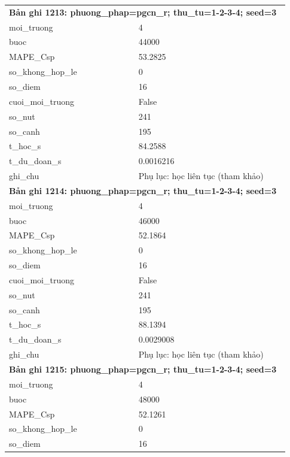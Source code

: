 \begin{longtable}{p{0.43\linewidth}p{0.50\linewidth}}
\midrule
\multicolumn{2}{p{0.95\linewidth}}{\textbf{Bản ghi 1213: phuong\_phap=pgcn\_r; thu\_tu=1-2-3-4; seed=3}} \\
moi\_\allowbreak truong & 4 \\
buoc & 44000 \\
MAPE\_\allowbreak Csp & 53.2825 \\
so\_\allowbreak khong\_\allowbreak hop\_\allowbreak le & 0 \\
so\_\allowbreak diem & 16 \\
cuoi\_\allowbreak moi\_\allowbreak truong & False \\
so\_\allowbreak nut & 241 \\
so\_\allowbreak canh & 195 \\
t\_\allowbreak hoc\_\allowbreak s & 84.2588 \\
t\_\allowbreak du\_\allowbreak doan\_\allowbreak s & 0.0016216 \\
ghi\_\allowbreak chu & Phụ lục: học liên tục (tham khảo) \\
\midrule
\multicolumn{2}{p{0.95\linewidth}}{\textbf{Bản ghi 1214: phuong\_phap=pgcn\_r; thu\_tu=1-2-3-4; seed=3}} \\
moi\_\allowbreak truong & 4 \\
buoc & 46000 \\
MAPE\_\allowbreak Csp & 52.1864 \\
so\_\allowbreak khong\_\allowbreak hop\_\allowbreak le & 0 \\
so\_\allowbreak diem & 16 \\
cuoi\_\allowbreak moi\_\allowbreak truong & False \\
so\_\allowbreak nut & 241 \\
so\_\allowbreak canh & 195 \\
t\_\allowbreak hoc\_\allowbreak s & 88.1394 \\
t\_\allowbreak du\_\allowbreak doan\_\allowbreak s & 0.0029008 \\
ghi\_\allowbreak chu & Phụ lục: học liên tục (tham khảo) \\
\midrule
\multicolumn{2}{p{0.95\linewidth}}{\textbf{Bản ghi 1215: phuong\_phap=pgcn\_r; thu\_tu=1-2-3-4; seed=3}} \\
moi\_\allowbreak truong & 4 \\
buoc & 48000 \\
MAPE\_\allowbreak Csp & 52.1261 \\
so\_\allowbreak khong\_\allowbreak hop\_\allowbreak le & 0 \\
so\_\allowbreak diem & 16 \\

\end{longtable}
